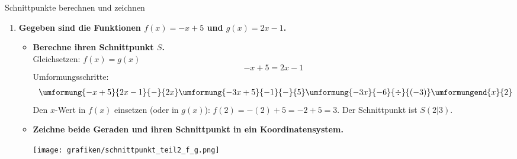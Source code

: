 \begin{loesungsumgebung}{Schnittpunkte berechnen und zeichnen}
\begin{enumerate}
\begin{itemize}
        \item \textbf{Geraden $m(x) = \frac{1}{3}x + 1$ und $n(x) = -\frac{2}{3}x + 4$} \\
        Gleichsetzen: $m(x) = n(x)$
        $$ \frac{1}{3}x + 1 = -\frac{2}{3}x + 4 $$
        Umformungsschritte:
        $$
        \begin{array}{r c l c l}
        \umformung{\frac{1}{3}x + 1}{-\frac{2}{3}x + 4}{+}{\frac{2}{3}x}
        \umformung{x + 1}{4}{-}{1}
        \umformungend{x}{3}
        \end{array}
        $$
        Den $x$-Wert in $m(x)$ einsetzen (oder in $n(x)$):
        $m(3) = \frac{1}{3}(3) + 1 = 1 + 1 = 2$.
        Der Schnittpunkt ist $S(3|2)$.
    \end{itemize}

    \item \textbf{Gegeben sind die Funktionen $f(x) = -x+5$ und $g(x) = 2x-1$.}
    \begin{itemize}
        \item \textbf{Berechne ihren Schnittpunkt $S$.} \\
        Gleichsetzen: $f(x) = g(x)$
        $$ -x + 5 = 2x - 1 $$
        Umformungsschritte:
        $$
        \begin{array}{r c l c l}
        \umformung{-x+5}{2x-1}{-}{2x}
        \umformung{-3x+5}{-1}{-}{5}
        \umformung{-3x}{-6}{\div}{(-3)}
        \umformungend{x}{2}
        \end{array}
        $$
        Den $x$-Wert in $f(x)$ einsetzen (oder in $g(x)$):
        $f(2) = -(2) + 5 = -2 + 5 = 3$.
        Der Schnittpunkt ist $S(2|3)$.

        \item \textbf{Zeichne beide Geraden und ihren Schnittpunkt in ein Koordinatensystem.}
        \begin{center}
        \texttt{[image: grafiken/schnittpunkt\_teil2\_f\_g.png]}
        \label{fig:schnittpunkt_f_g_teil2}
        \end{center}
    \end{itemize}
\end{enumerate}

\end{loesungsumgebung}

